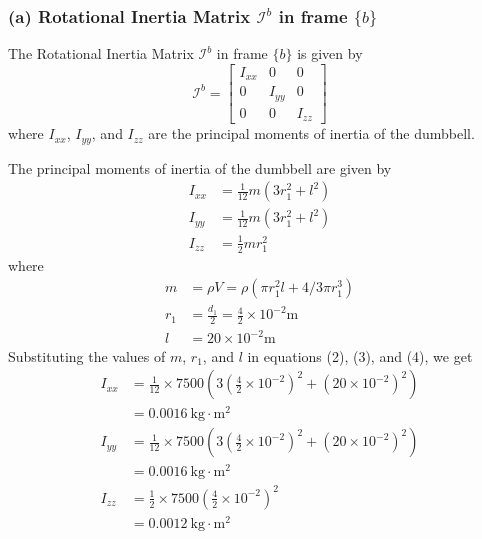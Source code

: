 \subsubsection*{(a) Rotational Inertia Matrix \( \mathcal{I}^{b} \) in frame \( \{b\} \)}

The Rotational Inertia Matrix \( \mathcal{I}^{b} \) in frame \( \{b\} \) is given by
\begin{equation}
    \mathcal{I}^{b}=\begin{bmatrix}
        I_{xx} & 0      & 0      \\
        0      & I_{yy} & 0      \\
        0      & 0      & I_{zz}
    \end{bmatrix}
\end{equation}
where \( I_{xx} \), \( I_{yy} \), and \( I_{zz} \) are the principal moments of inertia of the dumbbell.

The principal moments of inertia of the dumbbell are given by
\begin{align}
    I_{xx} & =\frac{1}{12} m\left(3 r_{1}^{2}+l^{2}\right) \\
    I_{yy} & =\frac{1}{12} m\left(3 r_{1}^{2}+l^{2}\right) \\
    I_{zz} & =\frac{1}{2} m r_{1}^{2}
\end{align}
where
\begin{align*}
    m     & =\rho V=\rho\left(\pi r_{1}^{2} l+4 / 3 \pi r_{1}^{3}\right) \\
    r_{1} & =\frac{d_{1}}{2}=\frac{4}{2} \times 10^{-2} \mathrm{m}       \\
    l     & =20 \times 10^{-2} \mathrm{m}
\end{align*}
Substituting the values of \( m \), \( r_{1} \), and \( l \) in equations (2), (3), and (4), we get
\begin{align*}
    I_{xx} & =\frac{1}{12} \times 7500\left(3\left(\frac{4}{2} \times 10^{-2}\right)^{2}+\left(20 \times 10^{-2}\right)^{2}\right) \\
           & =0.0016 \mathrm{~kg} \cdot \mathrm{m}^{2}                                                                             \\
    I_{yy} & =\frac{1}{12} \times 7500\left(3\left(\frac{4}{2} \times 10^{-2}\right)^{2}+\left(20 \times 10^{-2}\right)^{2}\right) \\
           & =0.0016 \mathrm{~kg} \cdot \mathrm{m}^{2}                                                                             \\
    I_{zz} & =\frac{1}{2} \times 7500\left(\frac{4}{2} \times 10^{-2}\right)^{2}                                                   \\
           & =0.0012 \mathrm{~kg} \cdot \mathrm{m}^{2}
\end{align*}

